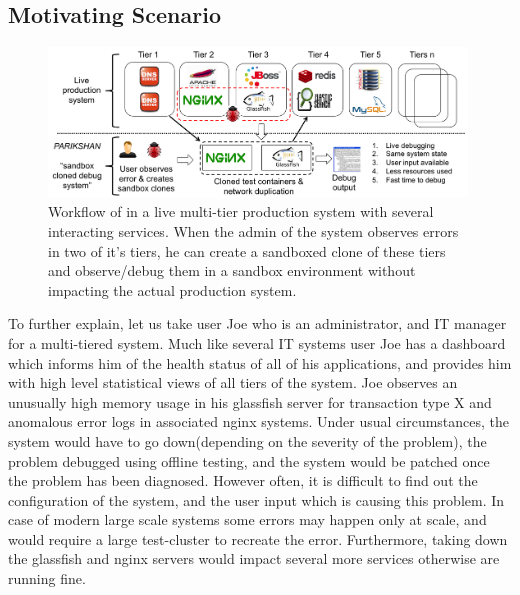 \subsection{Motivating Scenario}
\label{sec:motivation}

\begin{figure}[ht]
  \begin{center}
    \includegraphics[width=0.99\textwidth]{figs/workflow3.png}
    \caption{Workflow of \parikshan in a live multi-tier production system with several interacting services. When the admin of the system observes errors in two of it's tiers, he can create a sandboxed clone of these tiers and observe/debug them in a sandbox environment without impacting the actual production system.}
    \label{fig:motivation}
  \end{center}
\end{figure}

To further explain, let us take  user Joe who is an administrator, and IT manager for a multi-tiered system. 
Much like several IT systems user Joe has a dashboard which informs him of the health status of all of his applications, and provides him with high level statistical views of all tiers of the system.
Joe observes an unusually high memory usage in his glassfish server for transaction type X and anomalous error logs in associated nginx systems.
Under usual circumstances, the system would have to go down(depending on the severity of the problem), the problem debugged using offline testing,  and the system would be patched once the problem has been diagnosed.
However often, it is difficult to find out the configuration of the system, and the user input which is causing this problem.
In case of modern large scale systems some errors may happen only at scale, and would require a large test-cluster to recreate the error.
Furthermore, taking down the glassfish and nginx servers would impact several more services otherwise are running fine. 

